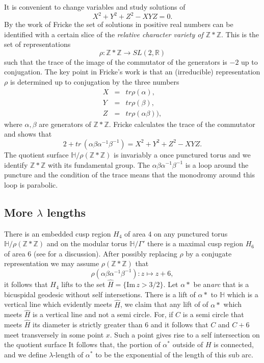 \documentclass[12pt,a4paper]{amsart}
\def\HH{\mathbb{H}}
\def\im{\mathrm{Im}\,}
\def\xx{\HH/\Gamma'}
\def\ZZ{\mathbb{Z}}
\def\RR{\mathbb{R}}
\begin{document}
It is convenient to change variables and study solutions of
\begin{equation}\label{f cubic}
X^2 + Y^2 + Z^2 - XYZ = 0.
\end{equation}
By the work of Fricke the set of solutions in positive real numbers
can be identified with a certain slice of the 
\textit{relative character variety of $\ZZ * \ZZ$}.
This is the set of  representations 
$$\rho: \ZZ * \ZZ \rightarrow SL(2, \RR)$$
such that the trace of the image of the commutator of the generators is $-2$
up to conjugation.
The key point in Fricke's work is that an (irreducible) representation $\rho$
is determined up to conjugation by the three numbers
\begin{eqnarray*}
X &= &tr \rho(\alpha), \\
Y  &= &tr \rho(\beta), \\
Z &= & tr \rho(\alpha\beta)),
\end{eqnarray*}
where $\alpha,\beta$ are generators of $\ZZ*\ZZ$.
Fricke calculates the trace of the commutator and shows that
\begin{equation}
2 + tr\,  (\alpha\beta\alpha^{-1}\beta^{-1}) = X^2 + Y^2 + Z^2 - XYZ .
\end{equation}
The quotient surface $\HH/\rho(\ZZ*\ZZ)$ is invariably a once punctured torus
and we identify $\ZZ * \ZZ$ with its fundamental group.
The $\alpha\beta\alpha^{-1}\beta^{-1}$ is a loop around the puncture
and the condition of the trace means that the monodromy around this loop is parabolic.


\subsection{More $\lambda$ lengths}

There is an embedded cusp region $H_4$  of area $4$ on any punctured torus
$\HH/\rho(\ZZ*\ZZ)$ and on the modular torus $\xx$ there is a maximal cusp
region $H_6$ of area $6$ (see \cite{thesis} for a discussion).
After possibly replacing $\rho$ by a conjugate representation we may assume
$\rho(\ZZ*\ZZ)$  that $$\rho(\alpha\beta\alpha^{-1}\beta^{-1}): z \mapsto z +
6,$$ it follows that $H_4$ lifts to the set $\hat{H} = \{ \im z > 3/2 \}$. Let
$\alpha*$ be an\textit{arc} that is a bicuspidal geodesic without self
intersetions. There is a lift of $\alpha*$ to $\HH$ which is a vertical line
which evidently meets $\hat{H}$, we claim that any lift of of $\alpha*$ which
meets $\hat{H}$ is a vertical line and not a semi circle. For, if $C$ is a semi
circle that meets $\hat{H}$ its diameter is strictly greater than $6$ and it
follows that $C$ and $C + 6$ meet transversely in some point $x$. Such a point
gives rise to a self intersection on the quotient surface It follows that, the
portion of $\alpha^*$ outside of $H$ is connected, and we define
$\lambda$-length  of $\alpha^*$ to be the exponential of the length of this sub
arc.
\end{document}
